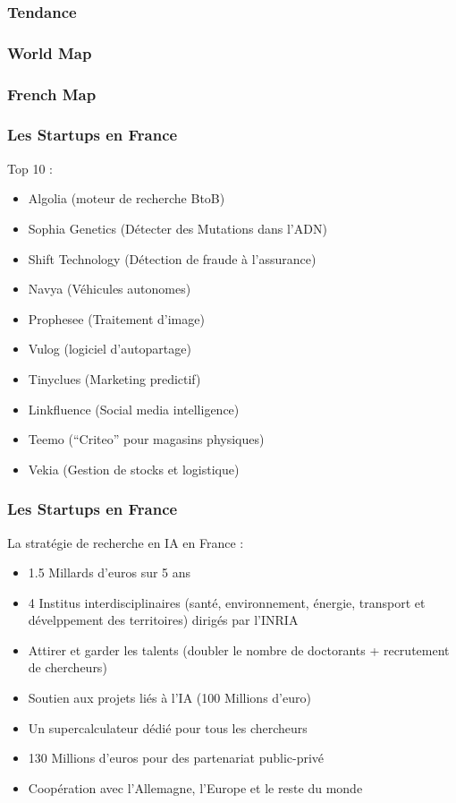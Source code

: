 \begin{frame}
  \frametitle{Tendance}
\end{frame}

\begin{frame}
  \frametitle{World Map}
\end{frame}

\begin{frame}
  \frametitle{French Map}
\end{frame}

\begin{frame}
  \frametitle{Les Startups en France}
  Top 10 :
  \begin{itemize}
  \item Algolia (moteur de recherche BtoB)
  \item Sophia Genetics (Détecter des Mutations dans l'ADN)
  \item Shift Technology (Détection de fraude à l'assurance)
  \item Navya (Véhicules autonomes)
  \item Prophesee (Traitement d'image)
  \item Vulog (logiciel d'autopartage)
  \item Tinyclues (Marketing predictif)
  \item Linkfluence (Social media intelligence)
  \item Teemo (``Criteo'' pour magasins physiques)
  \item Vekia (Gestion de stocks et logistique)
  \end{itemize}
\end{frame}

\begin{frame}
  \frametitle{Les Startups en France}
  La stratégie de recherche en IA en France :
  \begin{itemize}
  \item 1.5 Millards d'euros sur 5 ans
  \item 4 Institus interdisciplinaires (santé, environnement, énergie, transport et dévelppement des territoires) dirigés par l'INRIA
  \item Attirer et garder les talents (doubler le nombre de doctorants + recrutement de chercheurs)
  \item Soutien aux projets liés à l'IA (100 Millions d'euro)
  \item Un supercalculateur dédié pour tous les chercheurs
  \item 130 Millions d'euros pour des partenariat public-privé
  \item Coopération avec l'Allemagne, l'Europe et le reste du monde
  \end{itemize}
\end{frame}



